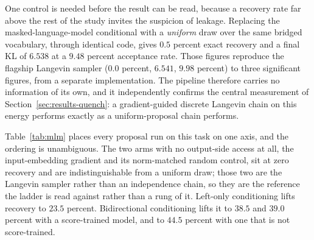One control is needed before the result can be read, because a recovery rate far above the rest of the study invites the suspicion of leakage. Replacing the masked-language-model conditional with a \emph{uniform} draw over the same bridged vocabulary, through identical code, gives $0.5$ percent exact recovery and a final KL of $6.538$ at a $9.48$ percent acceptance rate. Those figures reproduce the flagship Langevin sampler ($0.0$ percent, $6.541$, $9.98$ percent) to three significant figures, from a separate implementation. The pipeline therefore carries no information of its own, and it independently confirms the central measurement of Section~\ref{sec:results-quench}: a gradient-guided discrete Langevin chain on this energy performs exactly as a uniform-proposal chain performs.

Table~\ref{tab:mlm} places every proposal run on this task on one axis, and the ordering is unambiguous. The two arms with no output-side access at all, the input-embedding gradient and its norm-matched random control, sit at zero recovery and are indistinguishable from a uniform draw; those two are the Langevin sampler rather than an independence chain, so they are the reference the ladder is read against rather than a rung of it. Left-only conditioning lifts recovery to $23.5$ percent. Bidirectional conditioning lifts it to $38.5$ and $39.0$ percent with a score-trained model, and to $44.5$ percent with one that is not score-trained.

